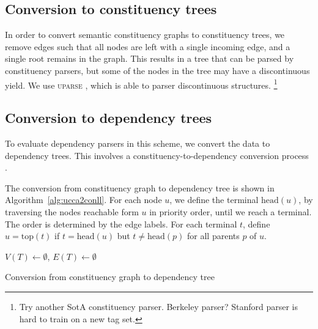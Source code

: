 \documentclass[11pt]{article}
\newcommand{\daniel}[1]{\footnote{\color{blue} #1}}
\begin{document}
\subsection{Conversion to constituency trees}

In order to convert semantic constituency graphs to constituency trees, we remove edges such that all nodes are left with a single incoming edge, and a single root remains in the graph. This results in a tree that can be parsed by constituency parsers, but some of the nodes in the tree may have a discontinuous yield. We use \textsc{uparse} \cite{maier2015discontinuous}, which is able to parser discontinuous structures.
\daniel{Try another SotA constituency parser. Berkeley parser? Stanford parser is hard to train on a new tag set.}


\subsection{Conversion to dependency trees}

To evaluate dependency parsers in this scheme, we convert the data to dependency trees. This involves a constituency-to-dependency conversion process \cite{...}.

The conversion from constituency graph to dependency tree is shown in Algorithm~\ref{alg:ucca2conll}. For each node $u$, we define the terminal $\mathrm{head}(u)$, by traversing the nodes reachable form $u$ in priority order, until we reach a terminal. The order is determined by the edge labels. For each terminal $t$, define $u=\mathrm{top}(t)$ if $t=\mathrm{head}(u)$ but $t\neq \mathrm{head}(p)$ for all parents $p$ of $u$.

\begin{algorithm}
 $V(T) \leftarrow \emptyset$,
 $E(T) \leftarrow \emptyset$\\
 \caption{Conversion from constituency graph to dependency tree}
 \label{alg:ucca2conll}
\end{algorithm}
\end{document}
